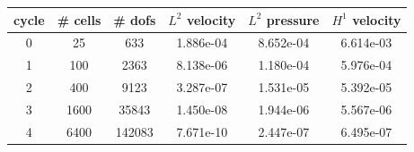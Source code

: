 \documentclass[10pt]{report}
\begin{document}
\begin{table}[H]
\begin{center}
\begin{tabular}{|c|c|c|c|c|c|} \hline
cycle & \# cells & \# dofs & $L^2$ velocity & $L^2$ pressure & $H^1$ velocity\\ \hline
0 & 25 & 633 & 1.886e-04 & 8.652e-04 & 6.614e-03\\ \hline
1 & 100 & 2363 & 8.138e-06 & 1.180e-04 & 5.976e-04\\ \hline
2 & 400 & 9123 & 3.287e-07 & 1.531e-05 & 5.392e-05\\ \hline
3 & 1600 & 35843 & 1.450e-08 & 1.944e-06 & 5.567e-06\\ \hline
4 & 6400 & 142083 & 7.671e-10 & 2.447e-07 & 6.495e-07\\ \hline
\end{tabular}
\end{center}
\end{table}
\end{document}
